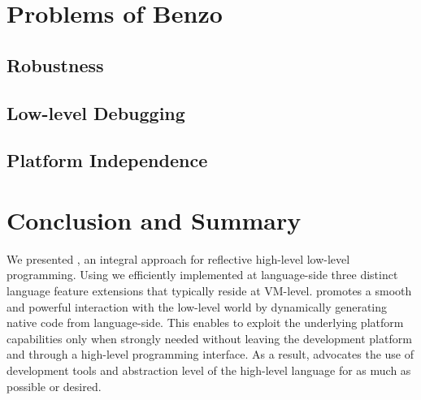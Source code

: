 \section{Problems of Benzo}


\subsection{Robustness}


\subsection{Low-level Debugging}

\subsection{Platform Independence}


\section{Conclusion and Summary}
We presented \B, an integral approach for reflective high-level low-level programming.
Using \B we efficiently implemented at language-side three distinct language feature extensions that typically reside at VM-level.
\B promotes a smooth and powerful interaction with the low-level world by dynamically generating native code from language-side.
This enables to exploit the underlying platform capabilities only when strongly needed without leaving the development platform and through a high-level programming interface. 
As a result, \B advocates the use of development tools and abstraction level of the high-level language for as much as possible or desired.

